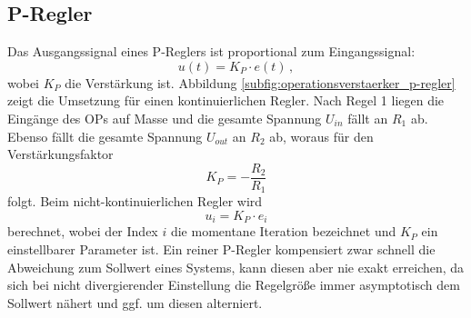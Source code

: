\subsection{P-Regler}\label{p-regler}
Das Ausgangssignal eines P-Reglers ist proportional zum Eingangssignal:
\begin{equation}\label{eq:p-regler_01}
	u(t)=K_P\cdot e(t)\,,
\end{equation}
wobei $K_P$ die Verstärkung ist. Abbildung
\ref{subfig:operationsverstaerker_p-regler} zeigt die Umsetzung für einen
kontinuierlichen Regler. Nach Regel 1 liegen die Eingänge des OPs auf Masse und die gesamte Spannung $U_{in}$ fällt an $R_1$ ab.
Ebenso fällt die gesamte Spannung $U_{out}$ an $R_2$ ab, woraus für den
Verstärkungsfaktor
\begin{equation}\label{eq:p-regler_02}
	K_P=-\frac{R_2}{R_1}
\end{equation}
folgt. Beim nicht-kontinuierlichen Regler wird
\begin{equation}\label{eq:p-regler_03}
	u_i=K_P\cdot e_i
\end{equation}
berechnet, wobei der Index $i$ die momentane Iteration bezeichnet und $K_P$ ein
einstellbarer Parameter ist. Ein reiner P-Regler kompensiert zwar schnell die
Abweichung zum Sollwert eines Systems, kann diesen aber nie exakt erreichen, da
sich bei nicht divergierender Einstellung die Regelgröße immer asymptotisch
dem Sollwert nähert und ggf. um diesen alterniert.

